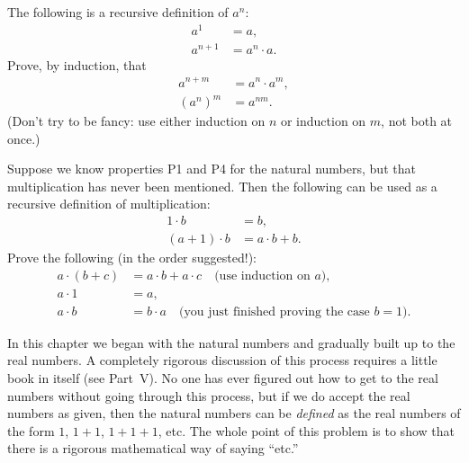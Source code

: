  The following is a recursive definition of $a^n$:
\begin{align*}
a^1 &= a,\\
a^{n+1} &= a^n \cdot a.
\end{align*}
Prove, by induction, that
\begin{align*}
a^{n+m} &= a^n \cdot a^m,\\
(a^n)^m &= a^{nm}.
\end{align*}
(Don't try to be fancy: use either induction on $n$ or induction on $m$, not
both at once.)

 Suppose we know properties P1 and P4 for the natural numbers, but
that multiplication has never been mentioned. Then the following can be used
as a recursive definition of multiplication:
\begin{align*}
1 \cdot b &= b,\\
(a+1) \cdot b &= a \cdot b + b.
\end{align*}
Prove the following (in the order suggested!):
\begin{align*}
a \cdot (b+c) &= a \cdot b + a \cdot c
  \quad\text{(use induction on $a$)},\\
a \cdot 1 &= a,\\
a \cdot b &= b \cdot a
  \quad\text{(you just finished proving the case $b = 1$)}.
\end{align*}

 In this chapter we began with the natural numbers and gradually
built up to the real numbers. A completely rigorous discussion of this
process requires a little book in itself (see Part~V). No one has ever
figured out how to get to the real numbers without going through this
process, but if we do accept the real numbers as given, then the natural
numbers can be \emph{defined} as the real numbers of the form $1$, $1+1$,
$1+1+1$, etc. The whole point of this problem is to show that there is a
rigorous mathematical way of saying ``etc.''

